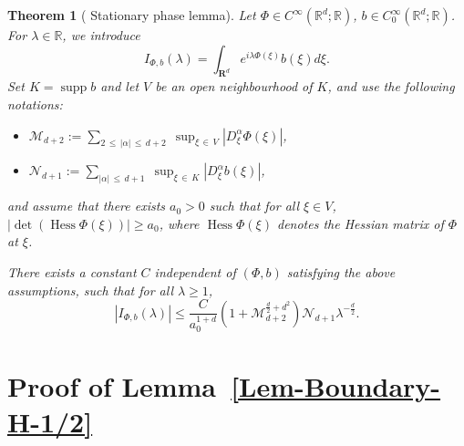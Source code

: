 \documentclass[10pt]{amsart}
\newtheorem{theo}{Theorem}[section]
\theoremstyle{definition}\newtheorem{defi}[theo]{Definition}\newtheorem{rema}[theo]{Remark}\newtheorem{exam}[theo]{Example}\newtheorem{exem}[theo]{Example}\newtheorem{nota}[theo]{Notation}
\newcommand*\R{\mathbb{R}}
\newcommand{\bfR}{\mathbf{R}}
\newcommand{\clM}{\mathcal{M}}
\newcommand{\clN}{\mathcal{N}}
\newcommand*\ds{\displaystyle}
\renewcommand{\leq}{\leqslant}
\renewcommand{\geq}{\geqslant}
\DeclareMathOperator{\Hess}{Hess}
\DeclareMathOperator{\supp}{supp}
\renewcommand{\det}{\operatorname{det}}
\begin{document}
\begin{theo}[{\cite[Theorem~1]{alazard2017stationary} Stationary phase lemma}]\label{Thm-Stationary-Phase}
Let $\Phi \in C^{\infty}(\R^d; \R)$, $b \in C_0^{\infty}(\R^d; \R)$. For $\lambda \in \R$, we introduce
\[
I_{\Phi,b}(\lambda)=\int_{\bfR^d} e^{i \lambda \Phi(\xi)} b(\xi) d \xi.
\]
Set $K=\supp b$ and let $V$ be an open neighbourhood of $K$, and use the following notations:
\begin{itemize}
\item $\ds\clM_{d+2}:=\sum_{2\, \leq\,|\alpha| \,\leq\,d+2}\; \sup _{\xi\,\in\,V}\left|D_{\xi}^\alpha \Phi(\xi)\right|$,
\item $\ds \clN_{d+1}:=\sum_{|\alpha|\,\leq \,d+1}\; \sup _{\xi\,\in\,K}\left|D_{\xi}^\alpha b(\xi)\right|$,
\end{itemize}
and assume that there exists $a_0 >0$ such that for all $\xi \in V$, $|\det (\Hess \Phi(\xi)) | \geq a_0$, where $ \Hess \Phi(\xi) $ denotes the Hessian matrix of $\Phi$ at $\xi$.

There exists a constant $C$ independent of $(\Phi, b)$ satisfying the above assumptions, such that for all $\lambda \geq 1$,
\[
|I_{\Phi,b} (\lambda)|
\leq
\frac{C}{a_0^{1+d}}\left(1+\clM_{d+2}^{\frac{d}{2}+d^2}\right) \clN_{d+1} \lambda^{-\frac{d}{2}}.
\]
\end{theo}

\section{Proof of Lemma~\ref{Lem-Boundary-H-1/2}}\label{Appendix-B}
\end{document}
